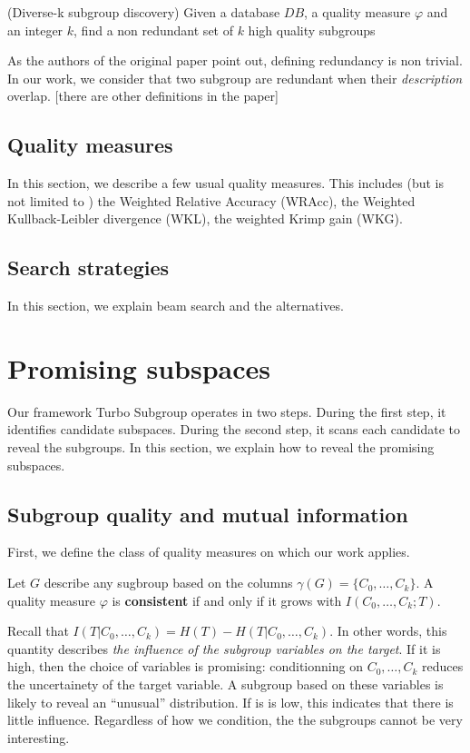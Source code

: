 \begin{problem}
    (Diverse-k subgroup discovery) Given a database $DB$, a quality measure
    $\varphi$ and an integer $k$, find a non redundant set of $k$ high quality subgroups
\end{problem}

As the authors of the original paper point out, defining redundancy 
is non trivial. In our work, we consider that two subgroup are redundant when
their \emph{description} overlap. [there are other definitions in the paper]

\subsection{Quality measures}
In this section, we describe a few usual quality measures. This includes (but
is not limited to ) the Weighted Relative Accuracy (WRAcc), the Weighted
Kullback-Leibler divergence (WKL), the weighted Krimp gain (WKG).

\subsection{Search strategies}
In this section, we explain beam search and the alternatives.

\section{Promising subspaces}

Our framework Turbo Subgroup operates in two steps. During the first step, it
identifies candidate subspaces.  During the second step, it scans each
candidate to reveal the subgroups. In this section, we explain how to reveal
the promising subspaces.

\subsection{Subgroup quality and mutual information}
First, we define the class of quality measures on which our work applies.
\begin{definition}
    Let $G$ describe any sugbroup based on the columns $\gamma(G) = \{C_0,
\ldots, C_k\}$.  A quality measure $\varphi$ is \textbf{consistent} if and only
if it grows with $I(C_0, \ldots, C_k; T)$.  
\end{definition}

Recall that $I(T | C_0, \ldots, C_k) = H(T) - H(T | C_0, \ldots,C_k)$. In other
words, this quantity describes \emph{the influence of the subgroup variables on
the target}. If it is high, then the choice of variables is promising:
conditionning on $C_0, \ldots,C_k$ reduces the uncertainety of the target
variable.  A subgroup based on these variables is likely to reveal an
``unusual'' distribution. If is is low, this indicates that there is little
influence. Regardless of how we condition, the the subgroups cannot be very
interesting.

